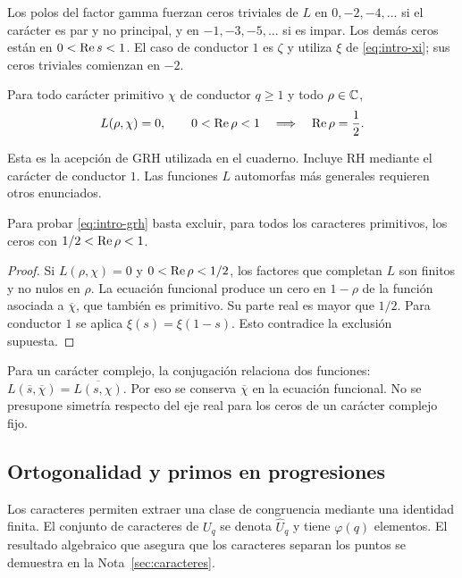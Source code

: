Los polos del factor gamma fuerzan ceros triviales de $L$ en
$0,-2,-4,\ldots$ si el carácter es par y no principal, y en
$-1,-3,-5,\ldots$ si es impar. Los demás ceros están en
$0<\operatorname{Re} s<1$. El caso de conductor $1$ es $\zeta$ y utiliza
$\xi$ de \eqref{eq:intro-xi}; sus ceros triviales comienzan en $-2$.

\begin{definicion}
Para todo carácter primitivo $\chi$ de conductor $q\ge1$ y todo
$\rho\in\mathbb{C}$,
\begin{equation}
 L(\rho,\chi)=0,\qquad 0<\operatorname{Re}\rho<1
 \quad\Longrightarrow\quad \operatorname{Re}\rho=\frac12.
 \label{eq:intro-grh}
\end{equation}
\end{definicion}

Esta es la acepción de GRH utilizada en el cuaderno. Incluye RH mediante
el carácter de conductor $1$. Las funciones $L$ automorfas más generales
requieren otros enunciados.

\begin{proposicion}
Para probar \eqref{eq:intro-grh} basta excluir, para todos los caracteres
primitivos, los ceros con $1/2<\operatorname{Re}\rho<1$.
\end{proposicion}
\begin{proof}
Si $L(\rho,\chi)=0$ y $0<\operatorname{Re}\rho<1/2$, los factores que completan
$L$ son finitos y no nulos en $\rho$. La ecuación funcional produce un
cero en $1-\rho$ de la función asociada a $\overline\chi$, que también
es primitivo. Su parte real es mayor que $1/2$. Para conductor $1$ se
aplica $\xi(s)=\xi(1-s)$. Esto contradice la exclusión supuesta.
\end{proof}

Para un carácter complejo, la conjugación relaciona dos funciones:
$L(\overline s,\overline\chi)=\overline{L(s,\chi)}$.
Por eso se conserva $\overline\chi$ en la ecuación funcional. No se
presupone simetría respecto del eje real para los ceros de un carácter
complejo fijo.

\subsection{Ortogonalidad y primos en progresiones}

Los caracteres permiten extraer una clase de congruencia mediante una
identidad finita. El conjunto de caracteres de $U_q$ se denota
$\widehat U_q$ y tiene $\varphi(q)$ elementos. El resultado algebraico
que asegura que los caracteres separan los puntos se demuestra en la
Nota~\ref{sec:caracteres}.

